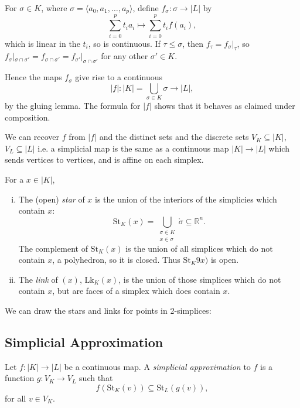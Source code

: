\documentclass[12pt]{article}
\begin{document}
\begin{proofbox}
	For $\sigma \in K$, where $\sigma = \langle a_0, a_1, \ldots, a_p\rangle$, define $f_\sigma : \sigma \to |L|$ by
	\[
	\sum_{i=  0}^p t_i a_i \mapsto \sum_{i = 0}^p t_i f(a_i),
	\]
	which is linear in the $t_i$, so is continuous. If $\tau \leq \sigma$, then $f_\tau = f_\sigma|_\tau$, so $f_\sigma|_{\sigma \cap \sigma'} = f_{\sigma \cap \sigma'} = f_{\sigma'}|_{\sigma \cap \sigma'}$ for any other $\sigma' \in K$.

	Hence the maps $f_\sigma$ give rise to a continuous 
	\[
	|f| : |K| = \bigcup_{\sigma \in K} \sigma \to |L|,
	\]
	by the gluing lemma. The formula for $|f|$ shows that it behaves as claimed under composition.
\end{proofbox}

We can recover $f$ from $|f|$ and the distinct sets and the discrete sets $V_K \subseteq |K|$, $V_L \subseteq |L|$ i.e. a simplicial map is the same as a continuous map $|K| \to |L|$ which sends vertices to vertices, and is affine on each simplex.

\begin{definition}
	For a $x \in |K|$,
	\begin{enumerate}[(i)]
		\item The (open) \emph{star} of $x$ is the union of the interiors of the simplicies which contain $x$:
			\[
			\mathrm{St}_K(x) = \bigcup_{\substack{\sigma \in K\\ x \in \sigma}} \mathring \sigma \subseteq \mathbb{R}^n.
			\]
			The complement of $\mathrm{St}_K(x)$ is the union of all simplices which do not contain $x$, a polyhedron, so it is closed. Thus $\mathrm{St}_K9x)$ is open.
		\item The \emph{link} of $(x)$, $\mathrm{Lk}_K(x)$, is the union of those simplices which do not contain $x$, but are faces of a simplex which does contain $x$.
	\end{enumerate}
\end{definition}

We can draw the stars and links for points in 2-simplices:

\subsection{Simplicial Approximation}
\label{sub:simp_app}

\begin{definition}
	Let $f : |K| \to |L|$ be a continuous map. A \emph{simplicial approximation} to $f$ is a function $g : V_K \to V_L$ such that
	\[
	f(\mathrm{St}_K(v)) \subseteq \mathrm{St}_L(g(v)),
	\]
	for all $v \in V_K$.
\end{definition}
\end{document}
